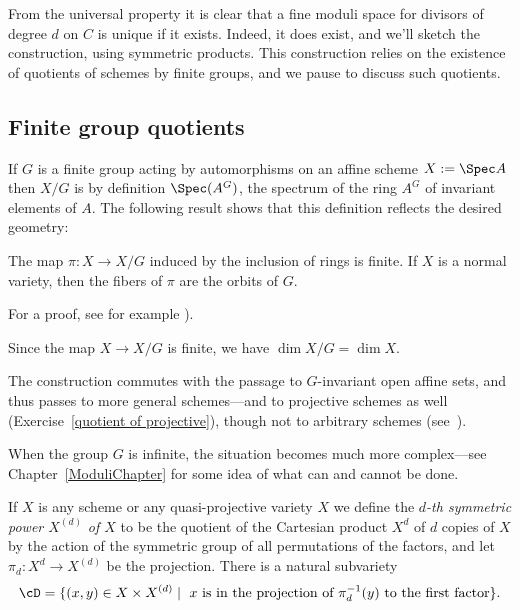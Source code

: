 From the universal property it is clear that a fine moduli space for divisors of degree $d$ on $C$ is unique if it exists. Indeed, it does exist, and we'll sketch the construction, using symmetric products. This construction relies on the existence of quotients of schemes by finite groups, and we pause to discuss such quotients.

\subsection{Finite group quotients}


If $G$ is a finite group acting by automorphisms on an affine scheme $X:=\Spec A$ then $X/G$ is by definition $\Spec(A^G)$, the spectrum of the ring $A^G$ of invariant elements of $A$. The following result shows that this definition reflects the desired geometry: 

\begin{theorem}\label{finite invariant theory}

 The map $\pi: X\to X/G$ induced by the inclusion of rings is finite. If $X$ is a normal variety, then the fibers of $\pi$  are the orbits of $G$.
 
\end{theorem}
For a proof, see for example \cite[Proposition 13.10]{Eisenbud1995}).  

Since the map $X\to X/G$ is finite, we have $\dim X/G = \dim X$. 

The construction commutes with the passage to $G$-invariant open affine sets, and thus passes to more general schemes---and to projective schemes as well (Exercise~\ref{quotient of projective}), though not to arbitrary schemes (see~\cite[Example 5.3.2]{Olsson-Stacks}).

When the group $G$ is infinite, the situation becomes much more complex---see Chapter~\ref{ModuliChapter} for some  idea of what can and cannot be done.

If $X$ is any scheme or any quasi-projective variety $X$ we define the \emph{$d$-th symmetric power $X^{(d)}$ of $X$} to be the quotient of the Cartesian product $X^d$ of $d$ copies of $X$ by the action of the symmetric group of all permutations of the factors, and let $\pi_d: X^d\to X^{(d)}$ be the projection. There is a natural
subvariety 
$$
\cD = \{(x,y) \in X \times X^{(d)}\mid \hbox{ $x$ is in the projection of $\pi_d^{-1}(y)$ to the first factor}\}.
$$



